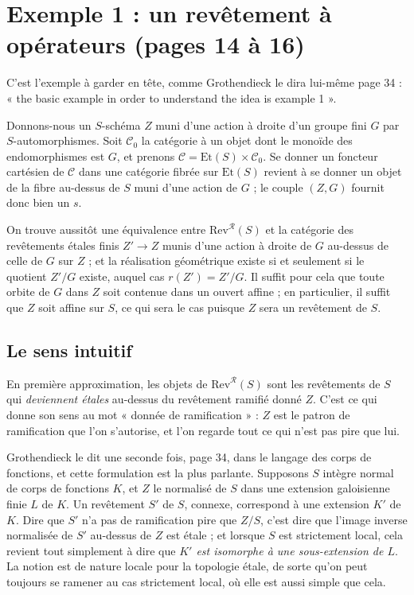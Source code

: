 \documentclass[11pt,a4paper]{article}
\begin{document}
\section*{Exemple 1 : un revêtement à opérateurs (pages 14 à 16)}

C'est l'exemple à garder en tête, comme Grothendieck le dira lui-même page 34 :
« the basic example in order to understand the idea is example 1 ».

Donnons-nous un $S$-schéma $Z$ muni d'une action à droite d'un groupe fini $G$
par $S$-automorphismes. Soit $\mathcal{C}_{0}$ la catégorie à un objet dont le
monoïde des endomorphismes est $G$, et prenons
$\mathcal{C} = \mathrm{Et}(S) \times \mathcal{C}_{0}$. Se donner un foncteur
cartésien de $\mathcal{C}$ dans une catégorie fibrée sur $\mathrm{Et}(S)$
revient à se donner un objet de la fibre au-dessus de $S$ muni d'une action de
$G$ ; le couple $(Z, G)$ fournit donc bien un $s$.

On trouve aussitôt une équivalence entre $\mathrm{Rev}^{\mathcal{R}}(S)$ et la
catégorie des revêtements étales finis $Z' \to Z$ munis d'une action à droite
de $G$ au-dessus de celle de $G$ sur $Z$ ; et la réalisation géométrique
existe si et seulement si le quotient $Z'/G$
existe, auquel cas $r(Z') = Z'/G$. Il suffit pour cela que toute orbite de $G$
dans $Z$ soit contenue dans un ouvert affine ; en particulier, il suffit que
$Z$ soit affine sur $S$, ce qui sera le cas puisque $Z$ sera un revêtement de
$S$.

\subsection*{Le sens intuitif}

En première approximation, les objets de $\mathrm{Rev}^{\mathcal{R}}(S)$ sont
les revêtements de $S$ qui \emph{deviennent étales} au-dessus du revêtement
ramifié donné $Z$. C'est ce qui donne son sens au mot « donnée de
ramification » : $Z$ est le patron de ramification que l'on s'autorise, et l'on
regarde tout ce qui n'est pas pire que lui.

Grothendieck le dit une seconde fois, page 34, dans le langage des corps de
fonctions, et cette formulation est la plus parlante. Supposons $S$ intègre
normal de corps de fonctions $K$, et $Z$ le normalisé de $S$ dans une extension
galoisienne finie $L$ de $K$. Un revêtement $S'$ de $S$, connexe, correspond à
une extension $K'$ de $K$. Dire que $S'$ n'a pas de ramification pire que
$Z/S$, c'est dire que l'image inverse normalisée de $S'$ au-dessus de $Z$ est
étale ; et lorsque $S$ est strictement local, cela revient tout simplement à
dire que \emph{$K'$ est isomorphe à une sous-extension de $L$}. La notion est
de nature locale pour la topologie étale, de sorte qu'on peut toujours se
ramener au cas strictement local, où elle est aussi simple que cela.
\end{document}
